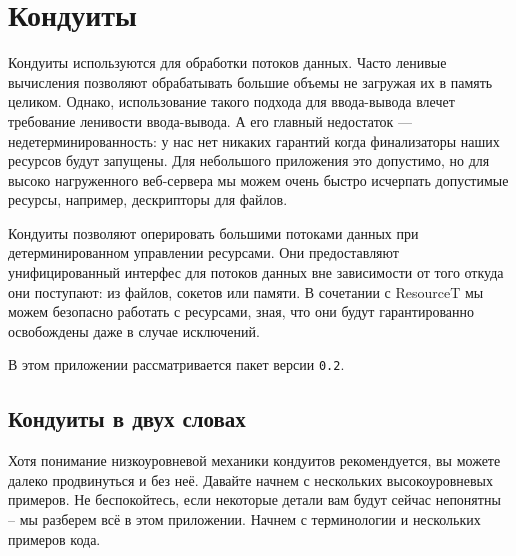 \chapter{Кондуиты}

Кондуиты используются для обработки потоков данных. Часто ленивые вычисления
позволяют обрабатывать большие объемы не загружая их в память целиком. Однако, 
использование такого подхода для ввода-вывода влечет требование ленивости ввода-вывода.
А его главный недостаток --- недетерминированность: у нас нет никаких гарантий когда
финализаторы наших ресурсов будут запущены. Для небольшого приложения это допустимо, но
для высоко нагруженного веб-сервера мы можем очень быстро исчерпать допустимые ресурсы,
например, дескрипторы для файлов.

Кондуиты позволяют оперировать большими потоками данных при детерминированном управлении
ресурсами. Они предоставляют унифицированный интерфес для потоков данных вне зависимости
от того откуда они поступают: из файлов, сокетов или памяти. В сочетании с ResourceT мы
можем безопасно работать с ресурсами, зная, что они будут гарантированно освобождены даже
в случае исключений.

В этом приложении рассматривается пакет 
 версии \verb=0.2=.

\section{Кондуиты в двух словах}
Хотя понимание низкоуровневой механики кондуитов рекомендуется, вы можете далеко
продвинуться и без неё. Давайте начнем  с нескольких  высокоуровневых 	 примеров.  Не
беспокойтесь, если некоторые детали      вам   будут       сейчас	  непонятны -- 
  мы разберем всё  в этом   приложении. Начнем с терминологии и нескольких	  
примеров    кода.

